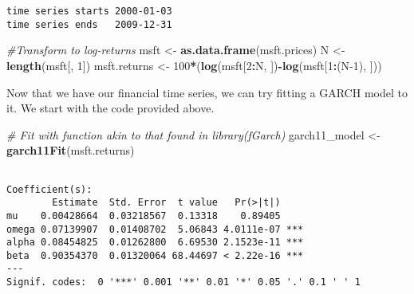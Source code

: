 \documentclass[]{book}
\newenvironment{Shaded}{\begin{snugshade}}{\end{snugshade}}
\newcommand{\CommentTok}[1]{\textcolor[rgb]{0.56,0.35,0.01}{\textit{#1}}}
\newcommand{\DecValTok}[1]{\textcolor[rgb]{0.00,0.00,0.81}{#1}}
\newcommand{\KeywordTok}[1]{\textcolor[rgb]{0.13,0.29,0.53}{\textbf{#1}}}
\newcommand{\NormalTok}[1]{#1}
\newcommand{\OperatorTok}[1]{\textcolor[rgb]{0.81,0.36,0.00}{\textbf{#1}}}
\newcommand{\StringTok}[1]{\textcolor[rgb]{0.31,0.60,0.02}{#1}}
\begin{document}
\begin{verbatim}
time series starts 2000-01-03
time series ends   2009-12-31
\end{verbatim}

\begin{Shaded}
\begin{Highlighting}[]
\CommentTok{#Transform to log-returns}
\NormalTok{msft <-}\StringTok{ }\KeywordTok{as.data.frame}\NormalTok{(msft.prices)}
\NormalTok{N <-}\StringTok{ }\KeywordTok{length}\NormalTok{(msft[, }\DecValTok{1}\NormalTok{])}
\NormalTok{msft.returns <-}\StringTok{ }\DecValTok{100}\OperatorTok{*}\NormalTok{(}\KeywordTok{log}\NormalTok{(msft[}\DecValTok{2}\OperatorTok{:}\NormalTok{N, ])}\OperatorTok{-}\KeywordTok{log}\NormalTok{(msft[}\DecValTok{1}\OperatorTok{:}\NormalTok{(N}\DecValTok{-1}\NormalTok{), ]))}
\end{Highlighting}
\end{Shaded}

Now that we have our financial time series, we can try fitting a GARCH
model to it. We start with the code provided above.

\begin{Shaded}
\begin{Highlighting}[]
\CommentTok{# Fit with function akin to that found in library(fGarch)}
\NormalTok{garch11_model <-}\StringTok{ }\KeywordTok{garch11Fit}\NormalTok{(msft.returns)}
\end{Highlighting}
\end{Shaded}

\begin{verbatim}

Coefficient(s):
        Estimate  Std. Error  t value   Pr(>|t|)    
mu    0.00428664  0.03218567  0.13318    0.89405    
omega 0.07139907  0.01408702  5.06843 4.0111e-07 ***
alpha 0.08454825  0.01262800  6.69530 2.1523e-11 ***
beta  0.90354370  0.01320064 68.44697 < 2.22e-16 ***
---
Signif. codes:  0 '***' 0.001 '**' 0.01 '*' 0.05 '.' 0.1 ' ' 1
\end{verbatim}
\end{document}
